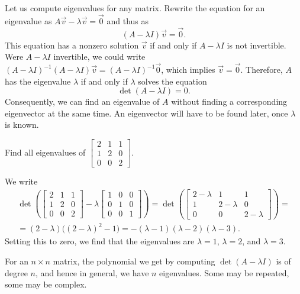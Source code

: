 Let us compute eigenvalues for any matrix.
Rewrite the equation for an eigenvalue as $A\vec{v}-\lambda \vec{v}=\vec{0}$
and thus as
\begin{equation*}
(A - \lambda I)\vec{v} = \vec{0} .
\end{equation*}
This equation has a nonzero solution $\vec{v}$ if and only if 
$A - \lambda I$ is not invertible.
Were $A - \lambda I$ invertible,
we could write
${(A - \lambda I)}^{-1}(A - \lambda I)\vec{v} = {(A-\lambda I)}^{-1}\vec{0}$,
which implies $\vec{v} = \vec{0}$.  Therefore,
$A$ has the
eigenvalue $\lambda$ if and only if $\lambda$ solves the equation
\begin{equation*}
\det (A-\lambda I) = 0 .
\end{equation*}
Consequently, we can find an eigenvalue of $A$ without
finding a corresponding eigenvector at the same time.  An eigenvector will have to be
found later, once $\lambda$ is known.

\begin{example}
Find all eigenvalues of 
$\left[ \begin{smallmatrix}
2 & 1 & 1 \\
1 & 2 & 0 \\
0 & 0 & 2
\end{smallmatrix} \right]$.

We write
\begin{multline*}
\det \left(
\begin{bmatrix}
2 & 1 & 1 \\
1 & 2 & 0 \\
0 & 0 & 2
\end{bmatrix}
- \lambda 
\begin{bmatrix}
1 & 0 & 0 \\
0 & 1 & 0 \\
0 & 0 & 1
\end{bmatrix}
\right)
=
\det \left(
\begin{bmatrix}
2-\lambda & 1 & 1 \\
1 & 2-\lambda & 0 \\
0 & 0 & 2-\lambda
\end{bmatrix}
\right)
= \\
=
(2-\lambda) \bigl({(2-\lambda)}^2 - 1\bigr)
= 
-(\lambda -1)(\lambda -2)(\lambda-3) .
\end{multline*}
Setting this to zero, we find that
the eigenvalues are $\lambda = 1$, $\lambda = 2$, and
$\lambda = 3$.
\end{example}

For an $n \times n$ matrix, the polynomial we get by
computing $\det(A - \lambda I)$ is of degree $n$, and hence
in general, we have $n$ eigenvalues.  Some may be repeated, some may be
complex.

